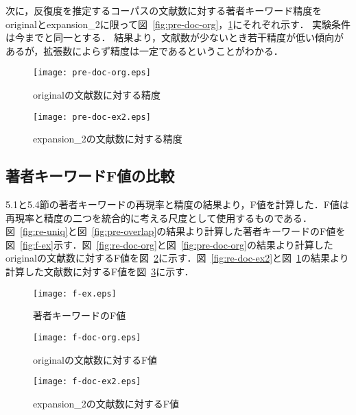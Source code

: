 \documentclass[japanese]{jnlp_1.2c}
\begin{document}
次に，反復度を推定するコーパスの文献数に対する著者キーワード精度をoriginalとexpansion\_2に限って図~\ref{fig:pre-doc-org}，\ref{fig:pre-doc-ex2}にそれぞれ示す．
実験条件は今までと同一とする．
結果より，文献数が少ないとき若干精度が低い傾向があるが，拡張数によらず精度は一定であるということがわかる．

\begin{figure}[p]
	\begin{center}
		\texttt{[image: pre-doc-org.eps]}
	\end{center}
	\caption{originalの文献数に対する精度}
	\label{fig:pre-doc-org}
    \vspace{\baselineskip}
	\begin{center}
		\texttt{[image: pre-doc-ex2.eps]}
	\end{center}
	\caption{expansion\_2の文献数に対する精度}
	\label{fig:pre-doc-ex2}
\end{figure}


\subsection{著者キーワードF値の比較}
5.1と5.4節の著者キーワードの再現率と精度の結果より，F値を計算した．F値は再現率と精度の二つを統合的に考える尺度として使用するものである．図~\ref{fig:re-uniq}と図~\ref{fig:pre-overlap}の結果より計算した著者キーワードのF値を図~\ref{fig:f-ex}示す．図~\ref{fig:re-doc-org}と図~\ref{fig:pre-doc-org}の結果より計算したoriginalの文献数に対するF値を図~\ref{fig:f-doc-org}に示す．図~\ref{fig:re-doc-ex2}と図~\ref{fig:pre-doc-ex2}の結果より計算した文献数に対するF値を図~\ref{fig:f-doc-ex2}に示す．

\begin{figure}[p]
	\begin{center}
		\texttt{[image: f-ex.eps]}
	\end{center}
	\caption{著者キーワードのF値}
	\label{fig:f-ex}
    \vspace{\baselineskip}
	\begin{center}
		\texttt{[image: f-doc-org.eps]}
	\end{center}
	\caption{originalの文献数に対するF値}
	\label{fig:f-doc-org}
\end{figure}

\begin{figure}[t]
	\begin{center}
		\texttt{[image: f-doc-ex2.eps]}
	\end{center}
	\caption{expansion\_2の文献数に対するF値}
	\label{fig:f-doc-ex2}
\end{figure}
\end{document}
